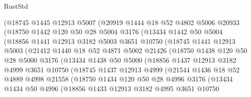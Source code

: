 \begin{lexlean}{RustStd}
\begin{coremodule}
        (@18745
          @1445
          @12913
          @5007
          (@20919
            @1444
            @18
            @52
            @4802
            @5006
            @20933
            (@18750
              @1442
              @120
              @50
              @28
              @5004
              @3176
              (@13434
                @1442
                @50
                @5004
                (@18856
                  @1441
                  @12913
                  @3182
                  @5003
                  @3651
                  @10750
                  (@18745
                    @1441
                    @12913
                    @5003
                    (@21412
                      @1440
                      @18
                      @52
                      @4871
                      @5002
                      @21426
                      (@18750
                        @1438
                        @120
                        @50
                        @28
                        @5000
                        @3176
                        (@13434
                          @1438
                          @50
                          @5000
                          (@18856
                            @1437
                            @12913
                            @3182
                            @4999
                            @3651
                            @10750
                            (@18745
                              @1437
                              @12913
                              @4999
                              (@21544
                                @1436
                                @18
                                @52
                                @4889
                                @4998
                                @21558
                                (@18750
                                  @1434
                                  @120
                                  @50
                                  @28
                                  @4996
                                  @3176
                                  (@13434
                                    @1434
                                    @50
                                    @4996
                                    (@18856
                                      @1433
                                      @12913
                                      @3182
                                      @4995
                                      @3651
                                      @10750

\end{coremodule}
\end{lexlean}
